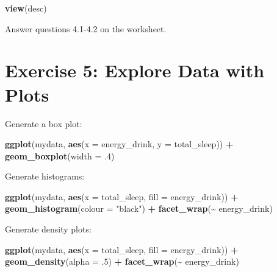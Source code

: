 \documentclass[
]{book}
\newenvironment{Shaded}{\begin{snugshade}}{\end{snugshade}}
\newcommand{\AttributeTok}[1]{\textcolor[rgb]{0.13,0.29,0.53}{#1}}
\newcommand{\DecValTok}[1]{\textcolor[rgb]{0.00,0.00,0.81}{#1}}
\newcommand{\FunctionTok}[1]{\textcolor[rgb]{0.13,0.29,0.53}{\textbf{#1}}}
\newcommand{\NormalTok}[1]{#1}
\newcommand{\SpecialCharTok}[1]{\textcolor[rgb]{0.81,0.36,0.00}{\textbf{#1}}}
\newcommand{\StringTok}[1]{\textcolor[rgb]{0.31,0.60,0.02}{#1}}
\let\oldsection\section
\renewcommand{\section}{\needspace{5\baselineskip}\oldsection}
\begin{document}
\begin{Shaded}
\begin{Highlighting}[]
\FunctionTok{view}\NormalTok{(desc)}
\end{Highlighting}
\end{Shaded}

Answer questions 4.1-4.2 on the worksheet.

\section{Exercise 5: Explore Data with Plots}\label{exercise-5-explore-data-with-plots}

Generate a box plot:

\begin{Shaded}
\begin{Highlighting}[]
\FunctionTok{ggplot}\NormalTok{(mydata, }\FunctionTok{aes}\NormalTok{(}\AttributeTok{x =}\NormalTok{ energy\_drink, }\AttributeTok{y =}\NormalTok{ total\_sleep)) }\SpecialCharTok{+}
  \FunctionTok{geom\_boxplot}\NormalTok{(}\AttributeTok{width =}\NormalTok{ .}\DecValTok{4}\NormalTok{)}
\end{Highlighting}
\end{Shaded}

Generate histograms:

\begin{Shaded}
\begin{Highlighting}[]
\FunctionTok{ggplot}\NormalTok{(mydata, }\FunctionTok{aes}\NormalTok{(}\AttributeTok{x =}\NormalTok{ total\_sleep, }\AttributeTok{fill =}\NormalTok{ energy\_drink)) }\SpecialCharTok{+}
  \FunctionTok{geom\_histogram}\NormalTok{(}\AttributeTok{colour =} \StringTok{"black"}\NormalTok{) }\SpecialCharTok{+}
  \FunctionTok{facet\_wrap}\NormalTok{(}\SpecialCharTok{\textasciitilde{}}\NormalTok{ energy\_drink)}
\end{Highlighting}
\end{Shaded}

Generate density plots:

\begin{Shaded}
\begin{Highlighting}[]
\FunctionTok{ggplot}\NormalTok{(mydata, }\FunctionTok{aes}\NormalTok{(}\AttributeTok{x =}\NormalTok{ total\_sleep, }\AttributeTok{fill =}\NormalTok{ energy\_drink)) }\SpecialCharTok{+}
  \FunctionTok{geom\_density}\NormalTok{(}\AttributeTok{alpha =}\NormalTok{ .}\DecValTok{5}\NormalTok{) }\SpecialCharTok{+}
  \FunctionTok{facet\_wrap}\NormalTok{(}\SpecialCharTok{\textasciitilde{}}\NormalTok{ energy\_drink)}
\end{Highlighting}
\end{Shaded}
\end{document}
